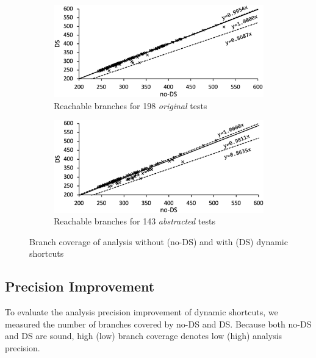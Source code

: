 \begin{figure}[t]
  \centering
  \begin{subfigure}[t]{0.48\textwidth}
    \includegraphics[width=\linewidth]{img/conc-precision}
    \vspace*{-1.5em}
    \caption{Reachable branches for 198 \textit{original} tests}
    \label{fig:precision-fail}
  \end{subfigure}
  \begin{subfigure}[t]{0.48\textwidth}
    \includegraphics[width=\linewidth]{img/abs-precision}
    \vspace*{-1.5em}
    \caption{Reachable branches for 143 \textit{abstracted} tests}
    \label{fig:precision-branch}
  \end{subfigure}
  \vspace*{-1em}
  \caption{Branch coverage of analysis without (no-DS) and with (DS) dynamic shortcuts}
  \label{fig:precision}
  \vspace*{-1.5em}
\end{figure}



\subsection{Precision Improvement}

To evaluate the analysis precision improvement of dynamic shortcuts,
we measured the number of branches covered by no-DS and DS.
Because both no-DS and DS are sound,
high (low) branch coverage denotes low (high) analysis precision.

